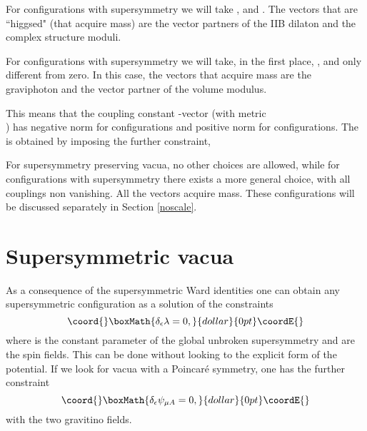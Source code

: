 \documentclass[a4paper,12pt]{article}
\begin{document}
\smallskip

\noindent \myHighlight{$\bullet$}\coordHE{} For configurations with \coordHE{} supersymmetry we
will take \coordHE{},  \coordHE{} and
\coordHE{}. The vectors that are ``higgsed" (that
acquire mass) are the vector partners of the IIB dilaton and the
\coordHE{} complex structure moduli.

\smallskip

\noindent \myHighlight{$\bullet$}\coordHE{} For configurations with \coordHE{} supersymmetry
we will take, in the first place, \coordHE{},
\coordHE{} and only \coordHE{} different
from zero.  In this case, the vectors that acquire mass are the
graviphoton and the vector partner of the \myHighlight{$\K$}\coordHE{} volume modulus.

\bigskip

\noindent This means that  the coupling constant
\coordHE{}-vector \coordHE{} (with metric\\
\coordHE{}) has negative norm for \coordHE{}
configurations and positive norm  for \coordHE{} configurations. The
\coordHE{} is obtained by imposing the further constraint,
\coordHE{}


\bigskip

\noindent \myHighlight{$\bullet$}\coordHE{} For \coordHE{} supersymmetry preserving vacua, no
other choices are allowed, while for configurations with \coordHE{}
supersymmetry there exists a more general choice, with all
couplings \coordHE{} non vanishing. All the vectors acquire mass.
These configurations will be discussed separately in Section
\ref{noscale}.




\section{Supersymmetric vacua}
As a consequence of the supersymmetric Ward identities \cite{df}
one can obtain any supersymmetric configuration as a solution of
the constraints
$$\coord{}\boxMath{\delta_{\epsilon}\lambda=0,}{dollar}{0pt}\coordE{}$$
where \myHighlight{$\epsilon$}\coordHE{} is the constant parameter of the global unbroken
supersymmetry and \myHighlight{$\lambda$}\coordHE{} are the spin \coordHE{} fields. This
can be done without looking to the explicit form of the potential.
If we look for vacua with a Poincar\'e symmetry, one has the
further constraint
$$\coord{}\boxMath{\delta_{\epsilon}\psi_{\mu A}=0,}{dollar}{0pt}\coordE{}$$
with \coordHE{} the two gravitino fields.
\end{document}
